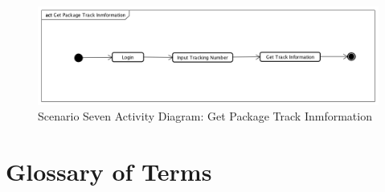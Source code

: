 \documentclass[12pt]{scrreprt}
\begin{document}
\begin{figure}[H]
  \centering\includegraphics[width=6in]{DocumentRes/8GetPackageTrackInmformation.png}
  \caption{Scenario Seven Activity Diagram: Get Package Track Inmformation}
\end{figure}

\chapter{Glossary of Terms}
\end{document}
